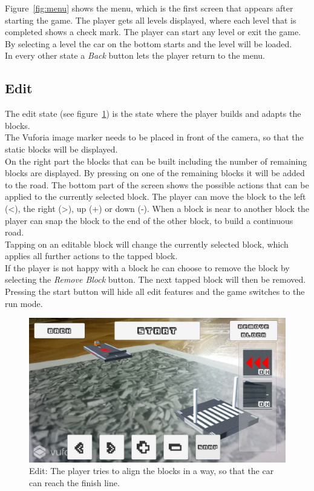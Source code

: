 \documentclass{vgtc}                          %
\begin{document}
Figure~\ref{fig:menu} shows the menu, which is the first screen that appears after starting the game. The player gets all levels displayed, where each level that is completed shows a check mark. The player can start any level or exit the game. By selecting a level the car on the bottom starts and the level will be loaded.\\
In every other state a \textit{Back} button lets the player return to the menu.

\subsection{Edit}

The edit state (see figure~\ref{fig:edit}) is the state where the player builds and adapts the blocks.\\
The Vuforia image marker needs to be placed in front of the camera, so that the static blocks will be displayed.\\
On the right part the blocks that can be built including the number of remaining blocks are displayed. By pressing on one of the remaining blocks it will be added to the road. The bottom part of the screen shows the possible actions that can be applied to the currently selected block. The player can move the block to the left (<), the right (>), up (+) or down (-). When a block is near to another block the player can snap the block to the end of the other block, to build a continuous road.\\
Tapping on an editable block will change the currently selected block, which applies all further actions to the tapped block.\\
If the player is not happy with a block he can choose to remove the block by selecting the \textit{Remove Block} button. The next tapped block will then be removed.\\
Pressing the start button will hide all edit features and the game switches to the run mode.

\begin{figure}[tb]
	\centering
	\includegraphics[width=\columnwidth]{edit}
	\caption{Edit: The player tries to align the blocks in a way, so that the car can reach the finish line.}
	\label{fig:edit}
\end{figure}
\end{document}
